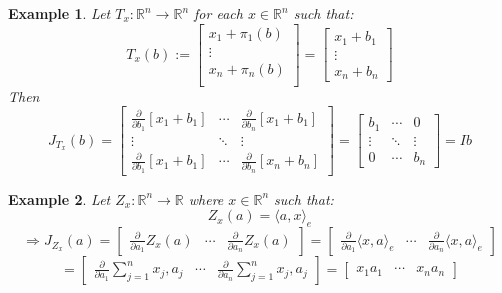 \documentclass[12pt]{extarticle}
\theoremstyle{plain}
\theoremstyle{Definition}
\theoremstyle{Definition}
\theoremstyle{plain}
\newtheorem{exmp}{Example}[section]
\begin{document}
\begin{exmp} 
	Let $T_x : \mathbb{R}^n \to \mathbb{R}^n$ for each $x \in \mathbb{R}^n$ such that:
	\[
	T_x(b) := 
	\begin{bmatrix}
	x_1 + \pi_1(b) \\ 
	\vdots \\ 
	x_n + \pi_n(b) \\ 
	\end{bmatrix}
	= 
	\begin{bmatrix}
	x_1 + b_1 \\ 
	\vdots \\ 
	x_n + b_n
	\end{bmatrix}
	\]
	Then
	\[
	J_{T_x}(b) = 
	\begin{bmatrix} 
	\frac{\partial }{\partial b_1}[x_1 + b_1] & \cdots & \frac{\partial }{\partial b_n}[x_1 + b_1] \\
	\vdots & \ddots & \vdots \\ 
	\frac{\partial }{\partial b_1}[x_1 + b_1] & \cdots & \frac{\partial }{\partial b_n}[x_n + b_n] 
	\end{bmatrix}
	=
	\begin{bmatrix} 
	b_1 & \cdots & 0 \\
	\vdots & \ddots & \vdots \\ 
	0 & \cdots & b_n
	\end{bmatrix}
	= Ib
	\]
\end{exmp}

\begin{exmp}
		Let $Z_x : \mathbb{R}^n \to \mathbb{R}$ where $x \in \mathbb{R}^n$ such that: \\ 
		$$Z_x(a) = \langle a,x \rangle_e$$
		\[
		\Rightarrow J_{Z_x} (a) = 
		\begin{bmatrix}
		\frac{\partial}{\partial a_1} Z_x(a) & \cdots & \frac{\partial}{\partial a_n} Z_x(a)
		\end{bmatrix}		
		= 
		\begin{bmatrix}
		\frac{\partial}{\partial a_1} \langle x,a\rangle_e & \cdots & \frac{\partial}{\partial a_n} \langle x,a\rangle_e
		\end{bmatrix}		
		\]
		\[
		= 
		\begin{bmatrix}
		\frac{\partial}{\partial a_1} \sum_{j=1}^n x_j,a_j & \cdots & \frac{\partial}{\partial a_n} \sum_{j=1}^n x_j,a_j
		\end{bmatrix}		
		= 
		\begin{bmatrix}
		x_1 a_1 & \cdots & x_n a_n
		\end{bmatrix}		
		\]

\end{exmp}
\end{document}
